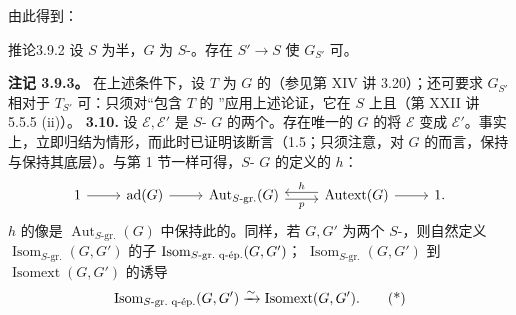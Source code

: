 由此得到：
\begin{SGAresult}{推论}{3.9.2}
设 $S$ 为半，$G$ 为 $S$-。存在 $S'\to S$ 使 $G_{S'}$ 可。
\end{SGAresult}
\textbf{注记 3.9.3。} 在上述条件下，设 $T$ 为 $G$ 的（参见第 XIV 讲 3.20）；还可要求 $G_{S'}$ 相对于 $T_{S'}$ 可：只须对“包含 $T$ 的 ”应用上述论证，它在 $S$ 上且（第 XXII 讲 5.5.5 (ii)）。
\textbf{3.10.} 设 $\mathcal E,\mathcal E'$ 是 $S$- $G$ 的两个。存在唯一的 $G$ 的将 $\mathcal E$ 变成 $\mathcal E'$。事实上，立即归结为情形，而此时已证明该断言（1.5；只须注意，对 $G$ 的而言，保持与保持其底层）。与第 1 节一样可得，$S$- $G$ 的定义的 $h$：
\[\begin{tikzcd}
1\arrow[r]&\operatorname{ad}(G)\arrow[r]&\operatorname{Aut}_{S\text{-gr.}}(G)\arrow[r,shift right,"p"']&\operatorname{Autext}(G)\arrow[l,shift right,"h"']\arrow[r]&1.
\end{tikzcd}\]
$h$ 的像是 $\operatorname{Aut}_{S\text{-gr.}}(G)$ 中保持此的。同样，若 $G,G'$ 为两个 $S$-，则自然定义 $\operatorname{Isom}_{S\text{-gr.}}(G,G')$ 的子 $\operatorname{Isom}_{S\text{-gr.\ q\text{-}ép.}}(G,G')$；
$\operatorname{Isom}_{S\text{-gr.}}(G,G')$ 到 $\operatorname{Isomext}(G,G')$ 的诱导
\[\operatorname{Isom}_{S\text{-gr.\ q\text{-}ép.}}(G,G')\xrightarrow\sim\operatorname{Isomext}(G,G').\tag{*}\]
